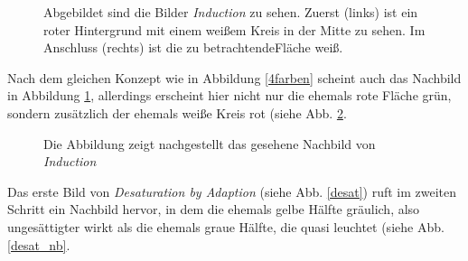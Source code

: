 \documentclass[11pt]{article}
\begin{document}
\begin{figure}[H]
\caption{Abgebildet sind die Bilder \textit{Induction} zu sehen. Zuerst (links) ist ein roter Hintergrund mit einem weißem Kreis in der Mitte zu sehen. Im Anschluss (rechts) ist die zu betrachtendeFläche weiß.}
\label{induction}
\end{figure}

Nach dem gleichen Konzept wie in Abbildung \ref{4farben} scheint auch das Nachbild in Abbildung \ref{induction}, allerdings erscheint hier nicht nur die ehemals rote Fläche grün, sondern zusätzlich der ehemals weiße Kreis rot (siehe Abb. \ref{induction_nb}.\\

\begin{figure}[H]
\caption{Die Abbildung zeigt nachgestellt das gesehene Nachbild von \textit{Induction}}
\label{induction_nb}
\end{figure}

Das erste Bild von \textit{Desaturation by Adaption} (siehe Abb. \ref{desat}) ruft im zweiten Schritt ein Nachbild hervor, in dem die ehemals gelbe Hälfte gräulich, also ungesättigter wirkt als die ehemals graue Hälfte, die quasi leuchtet (siehe Abb. \ref{desat_nb}. 
\end{document}
